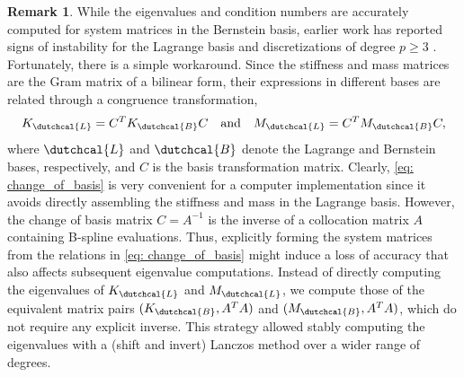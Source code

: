\documentclass{article}
\numberwithin{equation}{section}
\theoremstyle{definition}
\newtheorem{remark}[definition]{Remark}
\begin{document}
\begin{remark}
\label{rk: eigenvalue_computation}
While the eigenvalues and condition numbers are accurately computed for system matrices in the Bernstein basis, earlier work has reported signs of instability for the Lagrange basis and discretizations of degree $p \geq 3$ \cite{de2017condition,ballotta2023preconditioners}. Fortunately, there is a simple workaround. Since the stiffness and mass matrices are the Gram matrix of a bilinear form, their expressions in different bases are related through a congruence transformation,
\begin{equation}
\label{eq: change_of_basis}
    K_\dutchcal{L} = C^T K_\dutchcal{B} C \quad \text{and} \quad M_\dutchcal{L} = C^T M_\dutchcal{B} C,
\end{equation}
where $\dutchcal{L}$ and $\dutchcal{B}$ denote the Lagrange and Bernstein bases, respectively, and $C$ is the basis transformation matrix. Clearly, \eqref{eq: change_of_basis} is very convenient for a computer implementation since it avoids directly assembling the stiffness and mass in the Lagrange basis. However, the change of basis matrix $C=A^{-1}$ is the inverse of a collocation matrix $A$ containing B-spline evaluations. Thus, explicitly forming the system matrices from the relations in \eqref{eq: change_of_basis} might induce a loss of accuracy that also affects subsequent eigenvalue computations. Instead of directly computing the eigenvalues of $K_\dutchcal{L}$ and $M_\dutchcal{L}$, we compute those of the equivalent matrix pairs $(K_\dutchcal{B}, A^TA)$ and $(M_\dutchcal{B}, A^TA)$, which do not require any explicit inverse. This strategy allowed stably computing the eigenvalues with a (shift and invert) Lanczos method over a wider range of degrees.
\end{remark}
\end{document}
